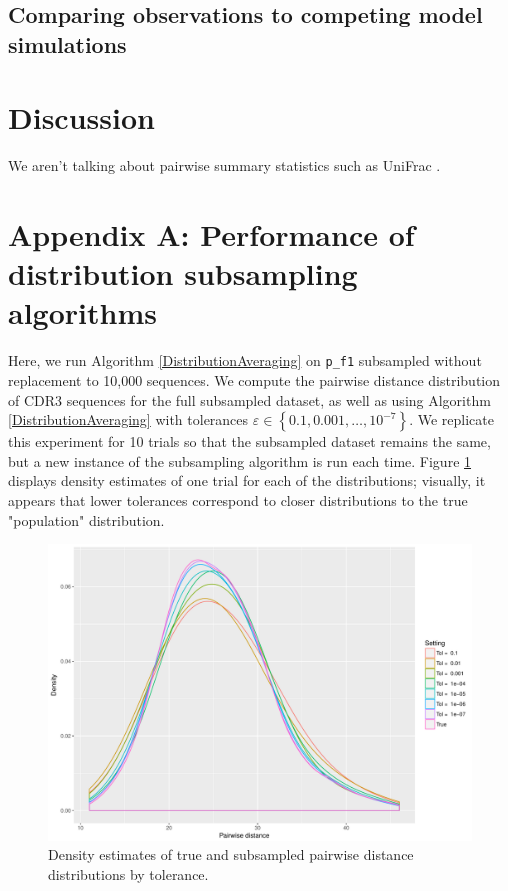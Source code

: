 \documentclass{article}
\begin{document}
\subsection*{Comparing observations to competing model simulations}

\section*{Discussion}
We aren't talking about pairwise summary statistics such as UniFrac \cite{De_Bourcy2017-pu}.




\section*{Appendix A: Performance of distribution subsampling algorithms}
Here, we run Algorithm \ref{DistributionAveraging} on \texttt{p\_f1} subsampled without replacement to 10,000 sequences.
We compute the pairwise distance distribution of CDR3 sequences for the full subsampled dataset, as well as using Algorithm \ref{DistributionAveraging} with tolerances $\varepsilon \in \left\{0.1, 0.001, \dotsc, 10^{-7} \right\}$.
We replicate this experiment for 10 trials so that the subsampled dataset remains the same, but a new instance of the subsampling algorithm is run each time.
Figure \ref{fig:Distributions} displays density estimates of one trial for each of the distributions; visually, it appears that lower tolerances correspond to closer distributions to the true "population" distribution.
\begin{figure}
    \includegraphics[width=\linewidth]{Figures/PairwiseDistance/density_by_tol.pdf}
    \caption{Density estimates of true and subsampled pairwise distance distributions by tolerance.}
    \label{fig:Distributions}
\end{figure}
\end{document}
